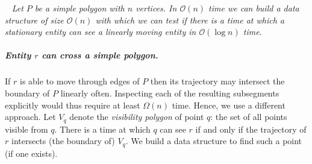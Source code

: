 \documentclass[UKenglish]{lipics-v2019}
\newcommand{\myremark}[4]{\textcolor{blue}{\textsc{#1 #2:}} \textcolor{#4}{\textsf{#3}}}
\newcommand{\frank}[2][says]{\myremark{Frank}{#1}{#2}{SeaGreen}}
\renewcommand{\myremark}[4]{}
\newcommand{\etal}{\textit{et al.}\xspace}
\newcommand{\mkmcal}[1]{\ensuremath{\mathcal{#1}}\xspace}
\renewcommand{\O}{\mkmcal{O}}
\newcommand{\thmheadfont}{\textcolor{darkgray}{$\blacktriangleright$}\nobreakspace\sffamily\bfseries}
\newenvironment{repeatenv}[2]%
  {\smallskip\noindent {\thmheadfont #1~\ref{#2}.}\ \slshape}
  {\normalfont}
\newenvironment{repeattheorem}    [1]{\begin{repeatenv}{Theorem}{#1}}    {\end{repeatenv}}
\begin{document}

\begin{repeattheorem}{thm:one_dead_one_alive}
  Let $P$ be a simple polygon with $n$ vertices. In $\O(n)$ time we
  can build a data structure of size $\O(n)$ with which we can test if
  there is a time at which a stationary entity can see a linearly
  moving entity in $\O(\log n)$ time.
\end{repeattheorem}




%

\subparagraph{Entity $r$ can cross a simple polygon.}
If $r$ is able to move through edges of $P$ then its trajectory may
intersect the boundary of $P$ linearly often. Inspecting each of the
resulting subsegments explicitly would thus require at least
$\Omega(n)$ time. Hence, we use a different approach.
Let $V_q$ denote the \emph{visibility polygon} of point $q$: the set
of all points visible from $q$. There is a time at which $q$ can see
$r$ if and only if the trajectory of $r$ intersects (the boundary of)
$V_q$. We build a data structure to find such a point (if one
exists).
\end{document}
